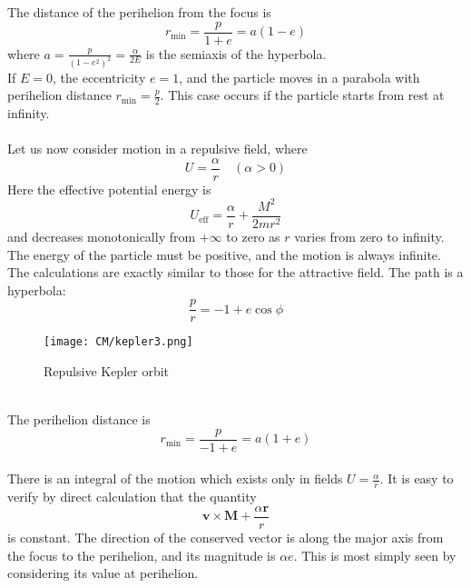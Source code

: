 The distance of the perihelion from the focus is
\[r_{\mathrm{min}} = \frac{p}{1+e} = a(1-e)\]
where $a = \frac{p}{(1-e^2)^2} = \frac{\alpha}{2E}$ is the semiaxis of the hyperbola.\\
If $E = 0$, the eccentricity $e = 1$, and the particle moves in a parabola with perihelion distance $r_{\mathrm{min}} = \frac{p}{2}$. This case occurs if the particle starts from rest
at infinity.\\ \\
Let us now consider motion in a repulsive field, where
\[U= \frac{\alpha}{r} \quad (\alpha > 0)\]
Here the effective potential energy is
\[U_{\mathrm{eff}} = \frac{\alpha}{r} + \frac{M^2}{2mr^2}\]
and decreases monotonically from $+\infty$ to zero as $r$ varies from zero to infinity. 
The energy of the particle must be positive, and the motion is always infinite. The calculations are exactly similar to those for the attractive field.
The path is a hyperbola:
\[\frac{p}{r} = -1 + e\cos\phi\]
\begin{figure}[!h]
	\centering
	\texttt{[image: CM/kepler3.png]}
	\caption{Repulsive Kepler orbit}
\end{figure}\\
The perihelion distance is
\[r_{\mathrm{min}} = \frac{p}{-1+e} = a(1+e)\]\\
There is an integral of the motion which exists only in fields $U = \frac{\alpha}{r}$. It is easy to verify by direct calculation that the quantity
\[\bm{v}\times\bm{M} + \frac{\alpha \bm{r}}{r}\]
is constant. The direction of the conserved vector is along the major axis from the focus to the perihelion, and its magnitude is $\alpha e$. This is most simply seen by considering its value at perihelion.

